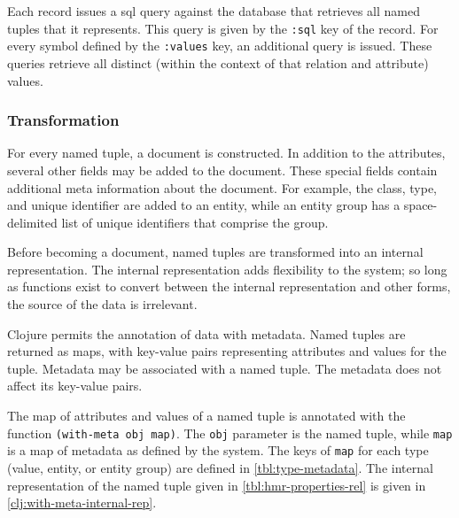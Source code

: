			Each record issues a \gls{sql} query against the database that retrieves all named tuples that it represents.  This query is given by the \texttt{:sql} key of the record.  For every symbol defined by the \texttt{:values} key, an additional query is issued.  These queries retrieve all distinct (within the context of that relation and attribute) values.
		
		\subsubsection{Transformation}
			For every named tuple, a document is constructed.  In addition to the attributes, several other fields may be added to the document.  These special fields contain additional meta information about the document.  For example, the class, type, and unique identifier are added to an entity, while an entity group has a space-delimited list of unique identifiers that comprise the group.
			
			Before becoming a document, named tuples are transformed into an internal representation.  The internal representation adds flexibility to the system; so long as functions exist to convert between the internal representation and other forms, the source of the data is irrelevant.
			
			Clojure permits the annotation of data with metadata.  Named tuples are returned as maps, with key-value pairs representing attributes and values for the tuple.  Metadata may be associated with a named tuple.  The metadata does not affect its key-value pairs.
			
			The map of attributes and values of a named tuple is annotated with the function \texttt{(with-meta obj map)}.  The \texttt{obj} parameter is the named tuple, while \texttt{map} is a map of metadata as defined by the system.  The keys of \texttt{map} for each type (value, entity, or entity group) are defined in \cref{tbl:type-metadata}.  The internal representation of the named tuple given in \cref{tbl:hmr-properties-rel} is given in \cref{clj:with-meta-internal-rep}.
			
